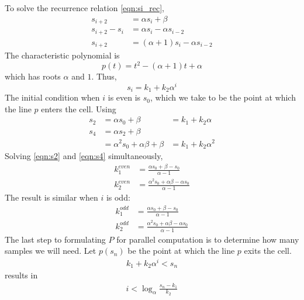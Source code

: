 \documentclass{egpubl}
\begin{document}
To solve the recurrence relation \eqref{eqn:si_rec},
\begin{align}
s_{i+2} &= \alpha s_i+\beta \\
s_{i+2}-s_i &= \alpha s_i-\alpha s_{i-2} \\
s_{i+2} &= (\alpha+1) s_i-\alpha s_{i-2}
\end{align}
The characteristic polynomial is
\begin{equation}
p(t) = t^2-(\alpha+1)t + \alpha
\end{equation}
which has roots $\alpha$ and $1$. Thus,
\begin{equation}
s_i = k_1 + k_2 \alpha^i
\end{equation}
The initial condition when $i$ is even is $s_0$, which we take to be the point at which the line $p$ enters the cell. Using
\begin{align}
s_2 &= \alpha s_0+\beta &= k_1+k_2\alpha  \label{eqn:s2} \\
s_4 &= \alpha s_2+\beta \\
    &= \alpha^2s_0+\alpha \beta + \beta &= k_1+k_2\alpha^2 \label{eqn:s4}
\end{align}
Solving \eqref{eqn:s2} and \eqref{eqn:s4} simultaneously,
\begin{align}
k_1^{even} &= \frac{\alpha s_0+\beta-s_0}{\alpha-1} \\
k_2^{even} &= \frac{\alpha^2 s_0 + \alpha\beta-\alpha s_0}{\alpha-1}
\end{align}
The result is similar when $i$ is odd:
\begin{align}
k_1^{odd} &= \frac{\alpha s_0+\beta-s_0}{\alpha-1} \\
k_2^{odd} &= \frac{\alpha^2 s_0 + \alpha\beta-\alpha s_0}{\alpha-1}
\end{align}
The last step to formulating $P$ for parallel computation is to determine how many samples we will need. Let $p(s_n)$ be the point at which the line $p$ exits the cell.
\begin{align}
k_1+k_2\alpha^i < s_n
\end{align}
results in
\begin{align}
i < \log_{\alpha}\frac{s_n-k_1}{k_2}
\end{align}
\end{document}
